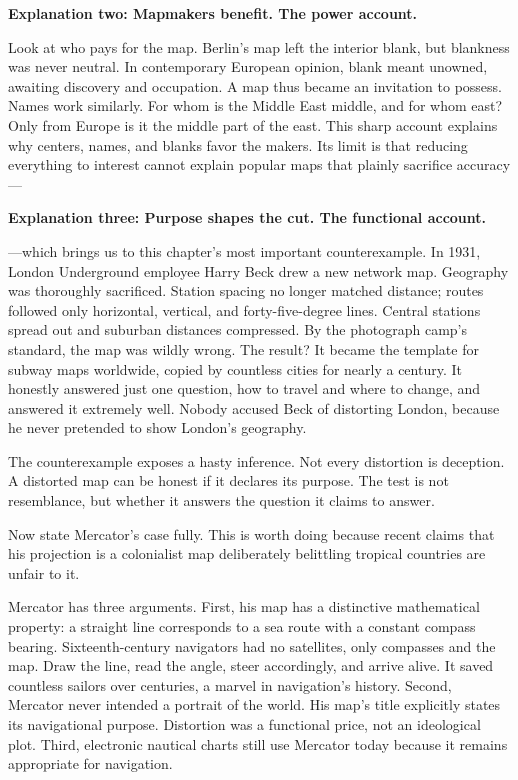 \textbf{Explanation two: Mapmakers benefit. The power account.}

Look at who pays for the map. Berlin's map left the interior blank, but blankness was never neutral. In contemporary European opinion, blank meant unowned, awaiting discovery and occupation. A map thus became an invitation to possess. Names work similarly. For whom is the Middle East middle, and for whom east? Only from Europe is it the middle part of the east. This sharp account explains why centers, names, and blanks favor the makers. Its limit is that reducing everything to interest cannot explain popular maps that plainly sacrifice accuracy---

\textbf{Explanation three: Purpose shapes the cut. The functional account.}

---which brings us to this chapter's most important counterexample. In 1931, London Underground employee Harry Beck drew a new network map. Geography was thoroughly sacrificed. Station spacing no longer matched distance; routes followed only horizontal, vertical, and forty-five-degree lines. Central stations spread out and suburban distances compressed. By the photograph camp's standard, the map was wildly wrong. The result? It became the template for subway maps worldwide, copied by countless cities for nearly a century. It honestly answered just one question, how to travel and where to change, and answered it extremely well. Nobody accused Beck of distorting London, because he never pretended to show London's geography.

The counterexample exposes a hasty inference. Not every distortion is deception. A distorted map can be honest if it declares its purpose. The test is not resemblance, but whether it answers the question it claims to answer.

Now state Mercator's case fully. This is worth doing because recent claims that his projection is a colonialist map deliberately belittling tropical countries are unfair to it.

Mercator has three arguments. First, his map has a distinctive mathematical property: a straight line corresponds to a sea route with a constant compass bearing. Sixteenth-century navigators had no satellites, only compasses and the map. Draw the line, read the angle, steer accordingly, and arrive alive. It saved countless sailors over centuries, a marvel in navigation's history. Second, Mercator never intended a portrait of the world. His map's title explicitly states its navigational purpose. Distortion was a functional price, not an ideological plot. Third, electronic nautical charts still use Mercator today because it remains appropriate for navigation.

